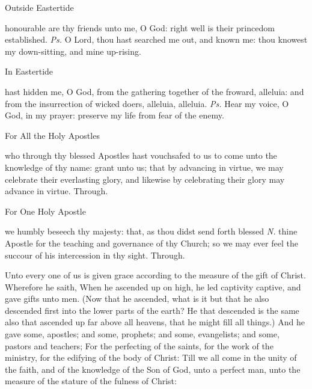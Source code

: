 \introit
\begin{inhead}
	Outside Eastertide
\end{inhead}
 honourable are thy friends unto me, O God: right well is their princedom established. \textit{Ps.} O Lord, thou hast searched me out, and known me: thou knowest my down-sitting, and mine up-rising.

\begin{inhead}
	In Eastertide
\end{inhead}
 hast hidden me, O God, from the gathering together of the froward, alleluia: and from the insurrection of wicked doers, alleluia, alleluia. \textit{Ps.} Hear  my voice, O God, in my prayer: preserve my life from fear of the enemy.

\clearpage
\collect
\begin{inhead}
	For All the Holy Apostles
\end{inhead}
 who through thy blessed Apostles hast vouchsafed to us to come unto the knowledge of thy name: grant unto us; that by advancing in virtue, we may celebrate their everlasting glory, and likewise by celebrating their glory may advance in virtue. Through.

\begin{inhead}
	For One Holy Apostle
\end{inhead}
 we humbly beseech thy majesty: that, as thou didst send forth blessed \textit{N.} thine Apostle for the teaching and governance of thy Church; so we may ever feel the succour of his intercession in thy sight. Through.

 Unto every one of us is given grace according to the measure of the gift of Christ. Wherefore he saith, When he ascended up on high, he led captivity captive, and gave gifts unto men. (Now that he ascended, what is it but that he also descended first into the lower parts of the earth? He that descended is the same also that ascended up far above all heavens, that he might fill all things.) And he gave some, apostles; and some, prophets; and some, evangelists; and some, pastors and teachers; For the perfecting of the saints, for the work of the ministry, for the edifying of the body of Christ: Till we all come in the unity of the faith, and of the knowledge of the Son of God, unto a perfect man, unto the measure of the stature of the fulness of Christ:



